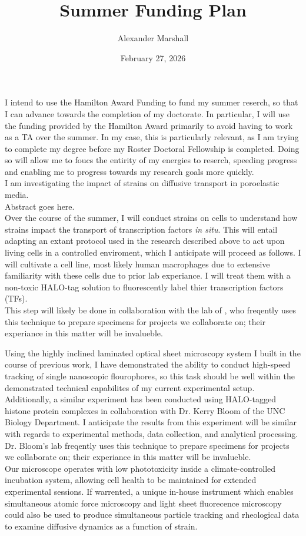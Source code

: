 \documentclass[10,letterpaper,roman]{article}
\begin{document}
\title{Summer Funding Plan}
\author{Alexander Marshall}
\date{February 27, 2026}
I intend to use the Hamilton Award Funding to fund my summer reserch, so that I can advance towards the completion of my doctorate. In particular, I will use the funding provided by the Hamilton Award primarily to avoid having to work as a TA over the summer. In my case, this is particularly relevant, as I am trying to complete my degree before my Roster Doctoral Fellowship is completed. Doing so will allow me to foucs the entirity of my energies to reserch, speeding progress and enabling me to progress towards my research goals more quickly.\\
I am investigating the impact of strains on diffusive transport in poroelastic media.\\

Abstract goes here.\\

Over the course of the summer, I will conduct strains on cells to understand how strains impact the transport of transcription factors \textit{in situ}. This will entail adapting an extant protocol used in the research described above to act upon living cells in a controlled enviroment, which I anticipate will proceed as follows. I will cultivate a cell line, most likely human macrophages due to extensive familiarity with these cells due to prior lab experiance. I will treat them with a non-toxic HALO-tag solution to fluorescently label thier transcription factors (TFs).\\

This step will likely be done in collaboration with the lab of , who freqently uses this technique to prepare specimens for projects we collaborate on; their experiance in this matter will be invalueble.

Using the highly inclined laminated optical sheet microscopy system I built in the course of previous work, I have demonstrated the ability to conduct high-speed tracking of single nanoscopic flourophores, so this task should be well within the demonstrated technical capabilites of my current experimental setup. Additionally, a similar experiment has been conducted using HALO-tagged histone protein complexes in collaboration with Dr. Kerry Bloom of the UNC Biology Department. I anticipate the results from this experiment will be similar with regards to experimental methods, data collection, and analytical processing.  Dr. Bloom's lab freqently uses this technique to prepare specimens for projects we collaborate on; their experiance in this matter will be invalueble.\\

Our microscope operates with low phototoxicity inside a climate-controlled incubation system, allowing cell health to be maintained for extended experimental sessions. If warrented, a unique in-house instrument which enables simultaneous atomic force microscopy and light sheet fluorecence microscopy could also be used to produce simultaneous particle tracking and rheological data to examine diffusive dynamics as a function of strain.
\end{document}
